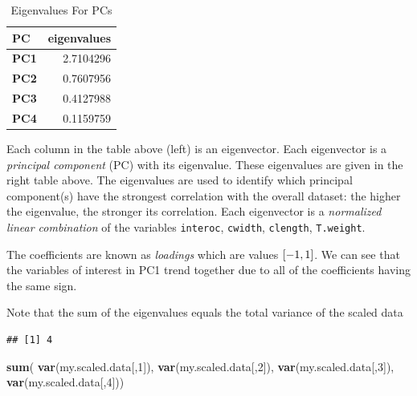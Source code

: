 \documentclass[]{article}
\newenvironment{Shaded}{\begin{snugshade}}{\end{snugshade}}
\newcommand{\DecValTok}[1]{\textcolor[rgb]{0.00,0.00,0.81}{#1}}
\newcommand{\KeywordTok}[1]{\textcolor[rgb]{0.13,0.29,0.53}{\textbf{#1}}}
\newcommand{\NormalTok}[1]{#1}
\newcommand{\OperatorTok}[1]{\textcolor[rgb]{0.81,0.36,0.00}{\textbf{#1}}}
\begin{document}
\begin{table}[t]

\caption{\label{tab:unnamed-chunk-7}Eigenvalues For PCs}
\centering
\begin{tabular}{>{\bfseries}l|r}
\hline
PC & eigenvalues\\
\hline
PC1 & 2.7104296\\
\hline
PC2 & 0.7607956\\
\hline
PC3 & 0.4127988\\
\hline
PC4 & 0.1159759\\
\hline
\end{tabular}
\end{table}

Each column in the table above (left) is an eigenvector. Each
eigenvector is a \emph{principal component} (PC) with its eigenvalue.
These eigenvalues are given in the right table above. The eigenvalues
are used to identify which principal component(s) have the strongest
correlation with the overall dataset: the higher the eigenvalue, the
stronger its correlation. Each eigenvector is a \emph{normalized linear
combination} of the variables \texttt{interoc}, \texttt{cwidth},
\texttt{clength}, \texttt{T.weight}.

The coefficients are known as \emph{loadings} which are values
\(\small[-1, 1]\). We can see that the variables of interest in PC1
trend together due to all of the coefficients having the same sign.

Note that the sum of the eigenvalues equals the total variance of the
scaled data

\begin{Shaded}
\end{Shaded}

\begin{verbatim}
## [1] 4
\end{verbatim}

\begin{Shaded}
\begin{Highlighting}[]
\KeywordTok{sum}\NormalTok{(}
  \KeywordTok{var}\NormalTok{(my.scaled.data[,}\DecValTok{1}\NormalTok{]),}
  \KeywordTok{var}\NormalTok{(my.scaled.data[,}\DecValTok{2}\NormalTok{]),}
  \KeywordTok{var}\NormalTok{(my.scaled.data[,}\DecValTok{3}\NormalTok{]),}
  \KeywordTok{var}\NormalTok{(my.scaled.data[,}\DecValTok{4}\NormalTok{]))}
\end{Highlighting}
\end{Shaded}
\end{document}
